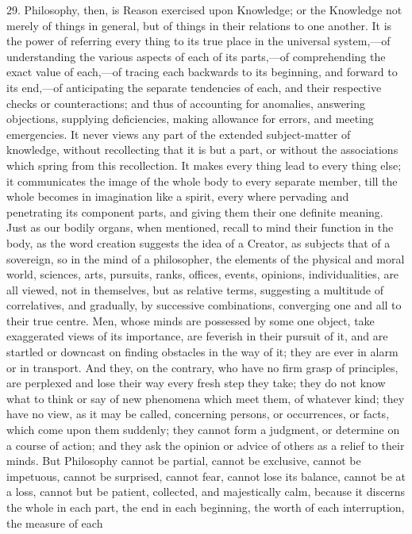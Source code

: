 29. Philosophy, then, is Reason exercised upon Knowledge; or the
Knowledge not merely of things in general, but of things in their
relations to one another. It is the power of referring every thing to
its true place in the universal system,—of understanding the various
aspects of each of its parts,—of comprehending the exact value of
each,—of tracing each backwards to its beginning, and forward to its
end,—of anticipating the separate tendencies of each, and their
respective checks or counteractions; and thus of accounting for
anomalies, answering objections, supplying deficiencies, making
allowance for errors, and meeting emergencies. It never views any part
of the extended subject-matter of knowledge, without recollecting that
it is but a part, or without the associations which spring from this
recollection. It makes every thing lead to every thing else; it
communicates the image of the whole body to every separate member,
till the whole becomes in imagination like a spirit, every where
pervading and penetrating its component parts, and giving them their
one definite meaning. Just as our bodily organs, when mentioned,
recall to mind their function in the body, as the word creation
suggests the idea of a Creator, as subjects that of a sovereign, so in
the mind of a philosopher, the elements of the physical and moral
world, sciences, arts, pursuits, ranks, offices, events, opinions,
individualities, are all viewed, not in themselves, but as relative
terms, suggesting a multitude of correlatives, and gradually, by
successive combinations, converging one and all to their true centre.
Men, whose minds are possessed by some one object, take exaggerated
views of its importance, are feverish in their pursuit of it, and are
startled or downcast on finding obstacles in the way of it; they are
ever in alarm or in transport. And they, on the contrary, who have no
firm grasp of principles, are perplexed and lose their way every fresh
step they take; they do not know what to think or say of new phenomena
which meet them, of whatever kind; they have no view, as it may be
called, concerning persons, or occurrences, or facts, which come upon
them suddenly; they cannot form a judgment, or determine on a course
of action; and they ask the opinion or advice of others as a relief to
their minds. But Philosophy cannot be partial, cannot be exclusive,
cannot be impetuous, cannot be surprised, cannot fear, cannot lose its
balance, cannot be at a loss, cannot but be patient, collected, and
majestically calm, because it discerns the whole in each part, the end
in each beginning, the worth of each interruption, the measure of each
